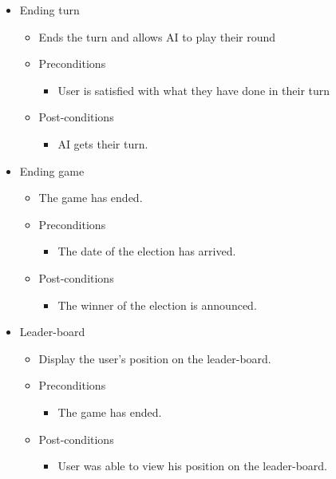 \documentclass{article}
\begin{document}
	\begin{itemize}
   		\item  Ending turn
			\begin{itemize}
				\item Ends the turn and allows AI to play their round
				\item Preconditions
				\begin{itemize}
					\item User is satisfied with what they have done in their turn
				\end{itemize}
				\item Post-conditions
				\begin{itemize}
					\item AI gets their turn.
				\end{itemize}
			\end{itemize}
	\end{itemize}
	
	\begin{itemize}
   		\item  Ending game
			\begin{itemize}
				\item The game has ended.
				\item Preconditions
				\begin{itemize}
					\item The date of the election has arrived.
				\end{itemize}
				\item Post-conditions
				\begin{itemize}
					\item The winner of the election is announced.
				\end{itemize}
			\end{itemize}
	\end{itemize}	

	\begin{itemize}
		\item Leader-board
			\begin{itemize}
				\item Display the user's position on the leader-board.
				\item Preconditions
				\begin{itemize}	
					\item The game has ended.
				\end{itemize}
				\item Post-conditions
				\begin{itemize}	
					\item User was able to view his position on the leader-board.
				\end{itemize}
			\end{itemize}
	\end{itemize}
			
\end{document}
